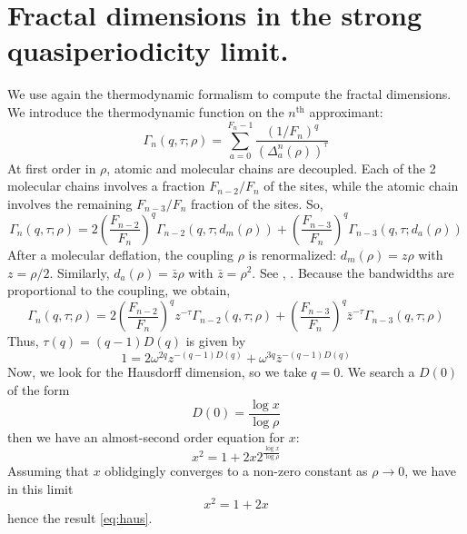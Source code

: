 \documentclass[11pt]{article}
\numberwithin{equation}{section}
\newcommand{\om}{\ensuremath{\omega}}
\newcommand{\nth}{$n^\text{th}$}
\begin{document}
\section{Fractal dimensions in the strong quasiperiodicity limit.}
\label{app:qp}
We use again the thermodynamic formalism to compute the fractal dimensions. We introduce the thermodynamic function on the \nth{} approximant:
\begin{equation}
	\Gamma_n(q,\tau; \rho) = \sum_{a=0}^{F_n-1} \frac{(1/F_n)^q}{(\Delta_a^n(\rho))^\tau}
\end{equation}
At first order in $\rho$, atomic and molecular chains are decoupled. Each of the 2 molecular chains involves a fraction $F_{n-2}/F_n$ of the sites, while the atomic chain involves the remaining $F_{n-3}/F_n$ fraction of the sites. So,
\begin{equation}
	\Gamma_n(q,\tau;\rho) = 2 \left( \frac{F_{n-2}}{F_n} \right)^q \Gamma_{n-2}(q, \tau; d_m(\rho)) + \left( \frac{F_{n-3}}{F_n} \right)^q \Gamma_{n-3}(q,\tau; d_a(\rho))
\end{equation}
After a molecular deflation, the coupling $\rho$ is renormalized: $d_m(\rho) = z \rho$ with $z = \rho/2$. Similarly, $d_a(\rho) = \bar z \rho$ with $\bar z = \rho^2$. See \cite{Niu1990}, \cite{Piechon95}.
Because the bandwidths are proportional to the coupling, we obtain,
\begin{equation}
	\Gamma_n(q,\tau;\rho) = 2 \left( \frac{F_{n-2}}{F_n} \right)^q z^{-\tau} \Gamma_{n-2}(q, \tau; \rho) + \left( \frac{F_{n-3}}{F_n} \right)^q \bar{z}^{-\tau} \Gamma_{n-3}(q,\tau; \rho)
\end{equation}
Thus, $\tau(q) = (q-1) D(q)$ is given by
\begin{equation}
\boxed{
	1 = 2 \om^{2q} z^{-(q-1)D(q)} + \om^{3q} \bar{z}^{-(q-1) D(q)}
}
\end{equation}
Now, we look for the Hausdorff dimension, so we take $q=0$. 
We search a $D(0)$ of the form
\begin{equation}
	D(0) = \frac{\log x}{\log \rho}
\end{equation}
then we have an almost-second order equation for $x$:
\begin{equation}
	x^2 = 1 + 2 x 2^{\frac{\log x}{\log \rho}}
\end{equation}
Assuming that $x$ oblidgingly converges to a non-zero constant as $\rho \rightarrow 0$, we have in this limit
\begin{equation}
	x^2 = 1 + 2 x
\end{equation}
hence the result \eqref{eq:haus}.

\newpage
{}

\end{document}

